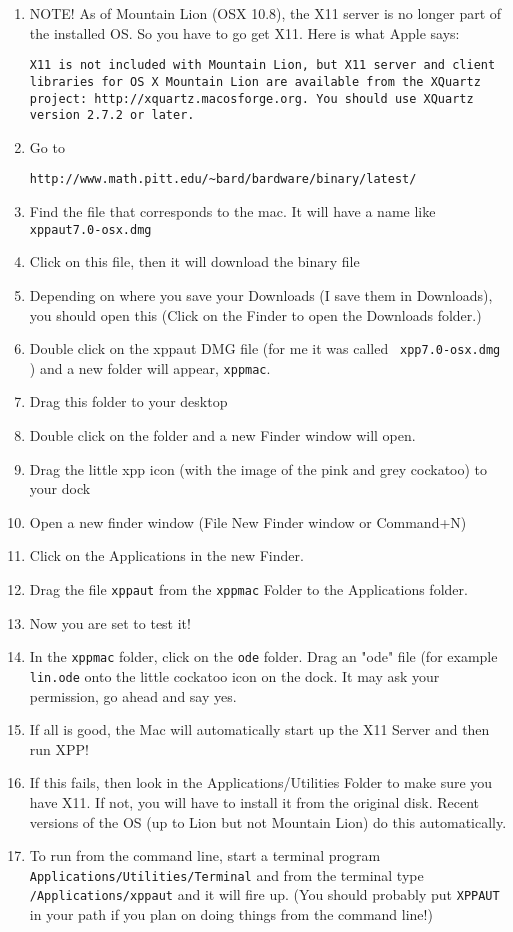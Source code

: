 \documentclass{article}
\begin{document}
\begin{enumerate}
\item NOTE! As of Mountain Lion (OSX 10.8), the X11 server is no longer part of the installed OS. So you have to go get X11. Here is what Apple says:
\begin{verbatim}
X11 is not included with Mountain Lion, but X11 server and client libraries for OS X Mountain Lion are available from the XQuartz project: http://xquartz.macosforge.org. You should use XQuartz version 2.7.2 or later.
\end{verbatim}
\item  Go to
\begin{verbatim}
http://www.math.pitt.edu/~bard/bardware/binary/latest/
\end{verbatim}
\item Find the file that corresponds to the mac. It will have a name
like {\tt xppaut7.0-osx.dmg}
\item Click on this file, then it will download the binary file
\item Depending on where you save your Downloads (I save them in
Downloads), you should open this (Click on the Finder to open the
Downloads folder.)
\item Double click on the xppaut DMG file (for me  it was called {\tt
xpp7.0-osx.dmg} ) and a new folder will appear, {\tt xppmac}.
\item  Drag this folder to your desktop
\item Double click on the folder and a new Finder window will open.
\item Drag the little xpp icon (with the image of the pink and grey
cockatoo) to your dock
\item Open a new finder window (File New Finder window or Command+N)
\item Click on the Applications in the new Finder.
\item Drag the file {\tt xppaut} from the {\tt xppmac} Folder to the
Applications folder.
\item Now you are set to test it!
\item In the {\tt xppmac} folder, click on the {\tt ode} folder. Drag
an "ode" file (for example {\tt lin.ode} onto the little cockatoo icon
on the dock. It may ask your permission, go ahead and say yes.
\item If all is good, the Mac will automatically start up the X11
Server and then run XPP!
\item If this fails, then look in the Applications/Utilities Folder to
make sure you have X11. If not, you will have to install it from the
original disk. Recent versions of the OS (up to Lion but not Mountain Lion)  do this automatically.
\item To run from the command line, start a terminal program {\tt
Applications/Utilities/Terminal} and from the terminal type {\tt
/Applications/xppaut} and it will fire up. (You should probably put {\tt XPPAUT} in your path if you plan on doing things from the command line!)
\end{enumerate}
\end{document}

